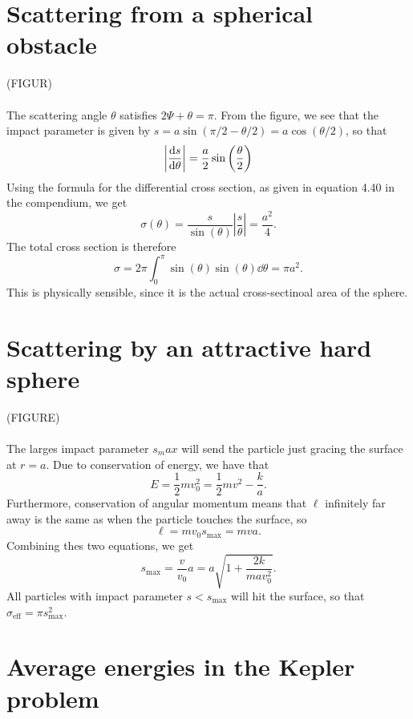 \documentclass{article}
\begin{document}
    \section{Scattering from a spherical obstacle}
        (FIGUR) \\ \\
        The scattering angle $\theta$ satisfies $2 \Psi + \theta = \pi$. From the figure, we see that the impact parameter is given by $s = a \sin(\pi/2 - \theta /2 ) = a \cos(\theta / 2)$, so that 
        \begin{equation*}
            \left| \dv{s}{\theta} \right| = \frac{a}{2} \sin\left(\frac{\theta}{2}\right)
        \end{equation*}
        Using the formula for the differential cross section, as given in equation 4.40 in the compendium, we get
        \begin{equation*}
            \sigma(\theta) = \frac{s}{\sin(\theta)} \left| \frac{s}{\theta} \right| = \frac{a^2}{4}.
        \end{equation*}
        The total cross section is therefore
        \begin{equation*}
            \sigma = 2 \pi \int_0^{\pi} \sin(\theta) \sin(\theta) \dd \theta = \pi a^2.
        \end{equation*}
        This is physically sensible, since it is the actual cross-sectinoal area of the sphere.



    \section{Scattering by an attractive hard sphere}
        (FIGURE) \\ \\
        The larges impact parameter $s_max$ will send the particle just gracing the surface at $r=a$. Due to conservation of energy, we have that 
        \begin{equation*}
            E = \frac{1}{2} m v_0^2 = \frac{1}{2}mv^2 - \frac{k}{a}.
        \end{equation*}
        Furthermore, conservation of angular momentum means that $\ell$ infinitely far away is the same as when the particle touches the surface, so
        \begin{equation*}
            \ell = m v_0 s_\mathrm{max} = mva.
        \end{equation*}
        Combining thes two equations, we get
        \begin{equation*}
            s_\mathrm{max} = \frac{v}{v_0}a = a \sqrt{1 + \frac{2 k}{m a v_0^2}}.
        \end{equation*}
        All particles with impact parameter $s < s_\mathrm{max}$ will hit the surface, so that $\sigma_\mathrm{eff} = \pi s_\mathrm{max}^2$.


    \section{Average energies in the Kepler problem}
    
\end{document}
